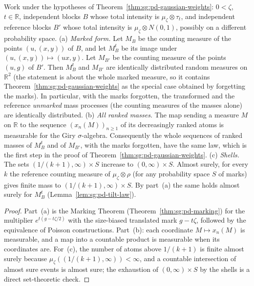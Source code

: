 \begin{lemma}\label{lem:sg:pd-gaussian-marked}
  \leanok
Work under the hypotheses of Theorem~\ref{thm:sg:pd-gaussian-weights}: $0<\zeta$, $t\in\mathbb R$, independent blocks $B$ whose total intensity is $\mu_\zeta\otimes\tau_t$, and independent reference blocks $B'$ whose total intensity is $\mu_\zeta\otimes N(0,1)$, possibly on a different probability space.
(a) \emph{Marked form.} Let $M_B$ be the counting measure of the points $(u,(x,y))$ of $B$, and let $M_B^{t}$ be its image under $(u,(x,y))\mapsto(ux,y)$. Let $M_{B'}$ be the counting measure of the points $(u,g)$ of $B'$. Then $M_B^{t}$ and $M_{B'}$ are identically distributed random measures on $\mathbb R^2$ (the statement is about the whole marked measure, so it contains Theorem~\ref{thm:sg:pd-gaussian-weights} as the special case obtained by forgetting the marks). In particular, with the marks forgotten, the transformed and the reference \emph{unmarked} mass processes (the counting measures of the masses alone) are identically distributed.
(b) \emph{All ranked masses.} The map sending a measure $M$ on $\mathbb R$ to the sequence $(x_n(M))_{n\ge1}$ of its decreasingly ranked atoms is measurable for the Giry $\sigma$-algebra. Consequently the whole sequences of ranked masses of $M_B^{t}$ and of $M_{B'}$, with the marks forgotten, have the same law, which is the first step in the proof of Theorem~\ref{thm:sg:pd-gaussian-weights}.
(c) \emph{Shells.} The sets $(1/(k+1),\infty)\times S$ increase to $(0,\infty)\times S$. Almost surely, for every $k$ the reference counting measure of $\mu_\zeta\otimes\rho$ (for any probability space $S$ of marks) gives finite mass to $(1/(k+1),\infty)\times S$. By part~(a) the same holds almost surely for $M_B^{t}$ (Lemma~\ref{lem:sg:pd-tilt-law}).
\end{lemma}
\begin{proof}
  \leanok
Part~(a) is the Marking Theorem (Theorem~\ref{thm:sg:pd-marking}) for the multiplier $e^{t(g-t\zeta/2)}$ with the size-biased translated mark $g-t\zeta$, followed by the equivalence of Poisson constructions. Part~(b): each coordinate $M\mapsto x_n(M)$ is measurable, and a map into a countable product is measurable when its coordinates are. For~(c), the number of atoms above $1/(k+1)$ is finite almost surely because $\mu_\zeta((1/(k+1),\infty))<\infty$, and a countable intersection of almost sure events is almost sure; the exhaustion of $(0,\infty)\times S$ by the shells is a direct set-theoretic check.
\end{proof}

